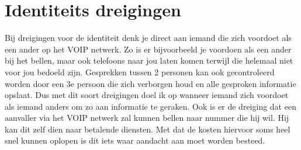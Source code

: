 \documentclass[pdftex,a4paper,12pt,twoside]{report}
\begin{document}
\newpage
\section{Identiteits dreigingen}
Bij dreigingen voor de identiteit denk je direct aan iemand die zich voordoet als een ander op het VOIP netwerk. Zo is er bijvoorbeeld je voordoen als een ander bij het bellen, maar ook telefoons naar jou laten komen terwijl die helemaal niet voor jou bedoeld zijn. Gesprekken tussen 2 personen kan ook gecontroleerd worden door een 3e persoon die zich verborgen houd en alle gesproken informatie opslaat. Dus met dit soort dreigingen doel ik op wanneer iemand zich voordoet als iemand anders om zo aan informatie te geraken. Ook is er de dreiging dat een aanvaller via het VOIP netwerk zal kunnen bellen naar nummer die hij wil. Hij kan dit zelf dien naar betalende diensten. Met dat de kosten hiervoor soms heel snel kunnen oplopen is dit iets waar aandacht aan moet worden besteed. 
\end{document}
